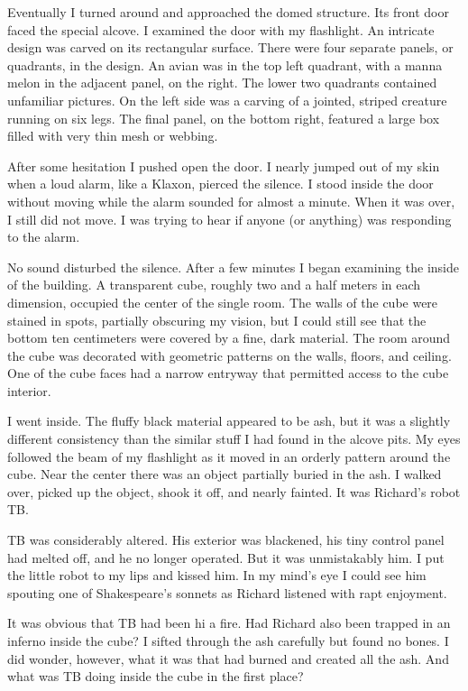\documentclass[]{article}
\begin{document}
Eventually I turned around and approached the domed structure.  Its front door faced the special alcove.  I examined the door with my flashlight.  An intricate design was carved on its rectangular surface.  There were four separate panels, or quadrants, in the design.  An avian was in the top left quadrant, with a manna melon in the adjacent panel, on the right.  The lower two quadrants contained unfamiliar pictures.  On the left side was a carving of a jointed, striped creature running on six legs.  The final panel, on the bottom right, featured a large box filled with very thin mesh or webbing.

After some hesitation I pushed open the door.  I nearly jumped out of my skin when a loud alarm, like a Klaxon, pierced the silence.  I stood inside the door without moving while the alarm sounded for almost a minute.  When it was over, I still did not move.  I was trying to hear if anyone (or anything) was responding to the alarm.

No sound disturbed the silence.  After a few minutes I began examining the inside of the building.  A transparent cube, roughly two and a half meters in each dimension, occupied the center of the single room.  The walls of the cube were stained in spots, partially obscuring my vision, but I could still see that the bottom ten centimeters were covered by a fine, dark material.  The room around the cube was decorated with geometric patterns on the walls, floors, and ceiling.  One of the cube faces had a narrow entryway that permitted access to the cube interior.

I went inside.  The fluffy black material appeared to be ash, but it was a slightly different consistency than the similar stuff I had found in the alcove pits.  My eyes followed the beam of my flashlight as it moved in an orderly pattern around the cube.  Near the center there was an object partially buried in the ash.  I walked over, picked up the object, shook it off, and nearly fainted.  It was Richard’s robot TB.

TB was considerably altered.  His exterior was blackened, his tiny control panel had melted off, and he no longer operated.  But it was unmistakably him.  I put the little robot to my lips and kissed him.  In my mind’s eye I could see him spouting one of Shakespeare’s sonnets as Richard listened with rapt enjoyment.

It was obvious that TB had been hi a fire.  Had Richard also been trapped in an inferno inside the cube? I sifted through the ash carefully but found no bones.  I did wonder, however, what it was that had burned and created all the ash.  And what was TB doing inside the cube in the first place?
\end{document}
